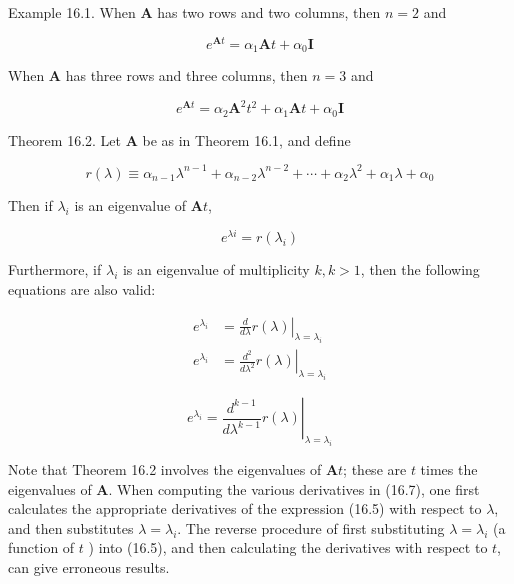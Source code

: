 \documentclass[10pt]{article}
\begin{document}
Example 16.1. When $\mathbf{A}$ has two rows and two columns, then $n=2$ and


\begin{equation*}
e^{\mathbf{A} t}=\alpha_{1} \mathbf{A} t+\alpha_{0} \mathbf{I} \tag{16.3}
\end{equation*}


When $\mathbf{A}$ has three rows and three columns, then $n=3$ and


\begin{equation*}
e^{\mathbf{A} t}=\alpha_{2} \mathbf{A}^{2} t^{2}+\alpha_{1} \mathbf{A} t+\alpha_{0} \mathbf{I} \tag{16.4}
\end{equation*}


Theorem 16.2. Let $\mathbf{A}$ be as in Theorem 16.1, and define


\begin{equation*}
r(\lambda) \equiv \alpha_{n-1} \lambda^{n-1}+\alpha_{n-2} \lambda^{n-2}+\cdots+\alpha_{2} \lambda^{2}+\alpha_{1} \lambda+\alpha_{0} \tag{16.5}
\end{equation*}


Then if $\lambda_{i}$ is an eigenvalue of $\mathbf{A} t$,


\begin{equation*}
e^{\lambda i}=r\left(\lambda_{i}\right) \tag{16.6}
\end{equation*}


Furthermore, if $\lambda_{i}$ is an eigenvalue of multiplicity $k, k>1$, then the following equations are also valid:


\begin{align*}
e^{\lambda_{i}} & =\left.\frac{d}{d \lambda} r(\lambda)\right|_{\lambda=\lambda_{i}} \\
e^{\lambda_{i}} & =\left.\frac{d^{2}}{d \lambda^{2}} r(\lambda)\right|_{\lambda=\lambda_{i}} \tag{16.7}
\end{align*}


$$
e^{\lambda_{i}}=\left.\frac{d^{k-1}}{d \lambda^{k-1}} r(\lambda)\right|_{\lambda=\lambda_{i}}
$$

Note that Theorem 16.2 involves the eigenvalues of $\mathbf{A} t$; these are $t$ times the eigenvalues of $\mathbf{A}$. When computing the various derivatives in (16.7), one first calculates the appropriate derivatives of the expression (16.5) with respect to $\lambda$, and then substitutes $\lambda=\lambda_{i}$. The reverse procedure of first substituting $\lambda=\lambda_{i}$ (a function of $t$ ) into (16.5), and then calculating the derivatives with respect to $t$, can give erroneous results.
\end{document}
